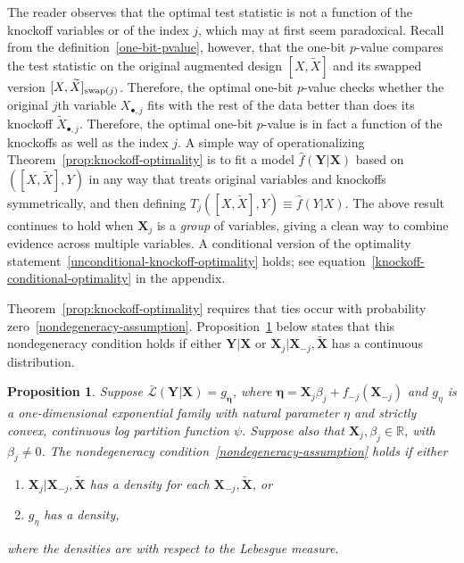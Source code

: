 \documentclass[12pt]{article}
\newtheorem{proposition}{Proposition}
\theoremstyle{definition}
\theoremstyle{remark}
\newcommand{\prx}{\bm X}
\newcommand{\srx}{X}
\newcommand{\prxk}{{{\widetilde{\bm X}}}}
\newcommand{\srxk}{\widetilde X}
\newcommand{\pry}{{\bm Y}}
\newcommand{\sry}{Y}
\begin{document}
The reader observes that the optimal test statistic is not a function of the knockoff variables or of the index $j$, which may at first seem paradoxical. Recall from the definition~\eqref{one-bit-pvalue}, however, that the one-bit $p$-value compares the test statistic on the original augmented design $[\srx, \srxk]$ and its swapped version $[\srx, \srxk]_{\textnormal{swap}(j)}$. Therefore, the optimal one-bit $p$-value checks whether the original $j$th variable $\srx_{\bullet, j}$ fits with the rest of the data better than does its knockoff $\srxk_{\bullet, j}$. Therefore, the optimal one-bit $p$-value is in fact a function of the knockoffs as well as the index $j$. A simple way of operationalizing Theorem~\ref{prop:knockoff-optimality} is to fit a model $\widehat f(\pry|\prx)$ based on $([\srx, \srxk], \sry)$ in any way that treats original variables and knockoffs symmetrically, and then defining $T_j([\srx, \srxk], \sry) \equiv \widehat f(\sry|\srx)$. The above result continues to hold when $\prx_j$ is a \textit{group} of variables, giving a clean way to combine evidence across multiple variables. A conditional version of the optimality statement~\eqref{unconditional-knockoff-optimality} holds; see equation~\eqref{knockoff-conditional-optimality} in the appendix.


Theorem~\ref{prop:knockoff-optimality} requires that ties occur with probability zero~\eqref{nondegeneracy-assumption}. Proposition~\ref{prop:nondegeneracy-knockoffs} below states that this nondegeneracy condition holds if either $\pry|\prx$ or $\prx_j|\prx_{-j}, \prxk$ has a continuous distribution.
\begin{proposition}\label{prop:nondegeneracy-knockoffs}
	Suppose $\bar{\mathcal L}(\pry|\prx) = g_{\bm\eta}$, where $\bm \eta = \prx_j \beta_j + f_{-j}(\prx_{-j})$ and $g_\eta$ is a one-dimensional exponential family with natural parameter $\eta$ and strictly convex, continuous log partition function $\psi$. Suppose also that $\prx_j, \beta_j \in \mathbb R$, with $\beta_j \neq 0$. The nondegeneracy condition~\eqref{nondegeneracy-assumption} holds if either 
	\begin{enumerate}
		\item $\prx_{j}|\prx_{-j}, \prxk$ has a density for each $\prx_{-j}, \prxk$, or
		\item $g_\eta$ has a density,
	\end{enumerate}
	where the densities are with respect to the Lebesgue measure.
\end{proposition}
\end{document}
